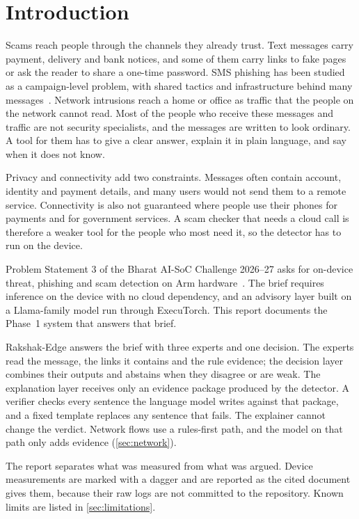 \section{Introduction}
\label{sec:introduction}

Scams reach people through the channels they already trust. Text messages carry payment, delivery and bank notices, and some of them carry links to fake pages or ask the reader to share a one-time password. SMS phishing has been studied as a campaign-level problem, with shared tactics and infrastructure behind many messages~\cite{smishing}. Network intrusions reach a home or office as traffic that the people on the network cannot read. Most of the people who receive these messages and traffic are not security specialists, and the messages are written to look ordinary. A tool for them has to give a clear answer, explain it in plain language, and say when it does not know.

Privacy and connectivity add two constraints. Messages often contain account, identity and payment details, and many users would not send them to a remote service. Connectivity is also not guaranteed where people use their phones for payments and for government services. A scam checker that needs a cloud call is therefore a weaker tool for the people who most need it, so the detector has to run on the device.

Problem Statement 3 of the Bharat AI-SoC Challenge 2026--27 asks for on-device threat, phishing and scam detection on Arm hardware~\cite{ps3}. The brief requires inference on the device with no cloud dependency, and an advisory layer built on a Llama-family model run through ExecuTorch. This report documents the Phase~1 system that answers that brief.

Rakshak-Edge answers the brief with three experts and one decision. The experts read the message, the links it contains and the rule evidence; the decision layer combines their outputs and abstains when they disagree or are weak. The explanation layer receives only an evidence package produced by the detector. A verifier checks every sentence the language model writes against that package, and a fixed template replaces any sentence that fails. The explainer cannot change the verdict. Network flows use a rules-first path, and the model on that path only adds evidence (\cref{sec:network}).

The report separates what was measured from what was argued. Device measurements are marked with a dagger and are reported as the cited document gives them, because their raw logs are not committed to the repository. Known limits are listed in \cref{sec:limitations}.


